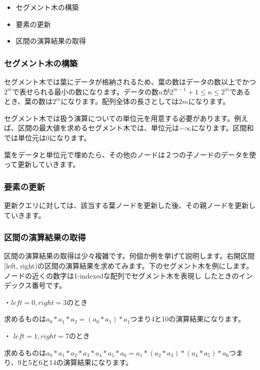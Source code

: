 \documentclass{jlreq}
\begin{document}
\begin{itemize}
	\item セグメント木の構築
	\item 要素の更新
	\item 区間の演算結果の取得
\end{itemize}

\subsubsection{セグメント木の構築}
\indent セグメント木では葉にデータが格納されるため、葉の数はデータの数以上でかつ$2^m$で表せられる最小の数になります。データの数$n$が$2^{m-1} + 1 \leq n \leq 2^m$であるとき、葉の数は$2^m$になります。配列全体の長さとしては$2 m$になります。

セグメント木では扱う演算についての単位元を用意する必要があります。例えば、区間の最大値を求めるセグメント木では、単位元は$-\infty$になります。区間和では単位元は0になります。

葉をデータと単位元で埋めたら、その他のノードは２つの子ノードのデータを使って更新していきます。

\subsubsection{要素の更新}
更新クエリに対しては、該当する葉ノードを更新した後、その親ノードを更新していきます。

\subsubsection{区間の演算結果の取得}
区間の演算結果の取得は少々複雑です。何個か例を挙げて説明します。右開区間[left, right)の区間の演算結果を求めてみます。下のセグメント木を例にします。ノードの近くの数字は1-indexedな配列でセグメント木を表現し
したときのインデックス番号です。

・$left = 0, right = 3$のとき

求めるものは$a_0 * a_1 * a_2 = (a_0 * a_1) * a_1$つまり4と10の演算結果になります。 

・ $left = 1, right = 7$のとき

求めるものは$a_0 * a_1 * a_2 * a_3 * a_4 * a_5 * a_6 = a_1 * (a_2 * a_3) * (a_4 * a_5) * a_6$つまり、9と5と6と14の演算結果になります。

\vspace{1cm}
\end{document}
